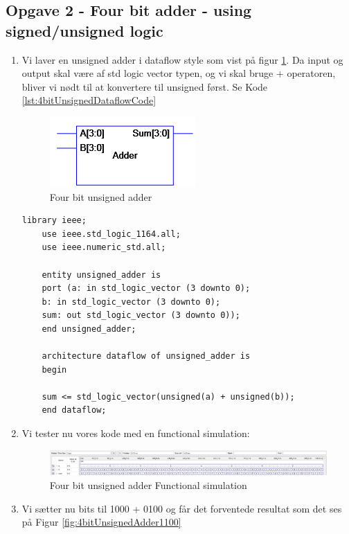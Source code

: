 \newpage
\subsection{Opgave 2 - Four bit adder - using signed/unsigned logic}

\begin{enumerate}
	\item[1)]
	Vi laver en unsigned adder i dataflow style som vist på figur \ref{fig:4bitUnsignedAdder}. Da input og output skal være af std logic vector typen, og vi skal bruge + operatoren, bliver vi nødt til at konvertere til unsigned først. Se Kode \ref{lst:4bitUnsignedDataflowCode}\\
	
	\begin{figure}[H]
		\centering
		\includegraphics[scale=0.5]{pictures/Oevelse3/4bit_unsigned_adder.jpg}
		\caption{Four bit unsigned adder}
		\label{fig:4bitUnsignedAdder}
	\end{figure}
	
	\begin{lstlisting}[caption={Four bit unsigned adder Dataflow VHDL kode},label={lst:4bitUnsignedDataflowCode}]
	library ieee;
	use ieee.std_logic_1164.all;
	use ieee.numeric_std.all;
	
	entity unsigned_adder is
	port (a: in std_logic_vector (3 downto 0);
	b: in std_logic_vector (3 downto 0);
	sum: out std_logic_vector (3 downto 0));
	end unsigned_adder;
	
	architecture dataflow of unsigned_adder is
	begin
	
	sum <= std_logic_vector(unsigned(a) + unsigned(b));
	end dataflow;
	\end{lstlisting}
	
	\item[2)]
	Vi tester nu vores kode med en functional simulation:\\
	\begin{figure}[H]	
		\centering
		\includegraphics[scale=0.4]{pictures/Oevelse3/4bit_unsigned_adder_functional_simulation.jpeg}
		\caption{Four bit unsigned adder Functional simulation}
		\label{fig:4bitUnsignedAdderFuncSim}
	\end{figure}
\newpage
	\item[3)]
	Vi sætter nu bits til 1000 + 0100 og får det forventede resultat som det ses på Figur \ref{fig:4bitUnsignedAdder1100}\\
	\begin{figure}[H]
		

\end{figure}
\end{enumerate}
